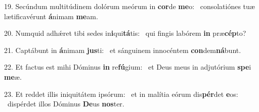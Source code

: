 19. Secúndum multitúdinem dolórum meórum in \textbf{cor}de \textbf{me}o: \ast\  consolatiónes tuæ lætificavérunt \textbf{á}nimam \textbf{me}am.\

20. Numquid adhǽret tibi sedes in\textbf{i}qui\textbf{tá}tis: \ast\  qui fingis labórem \textbf{in} præ\textbf{cép}to?\

21. Captábunt in \textbf{á}nimam \textbf{jus}ti: \ast\  et sánguinem innocéntem \textbf{con}dem\textbf{ná}bunt.\

22. Et factus est mihi Dóminus \textbf{in} re\textbf{fú}gium: \ast\  et Deus meus in adjutórium \textbf{spe}i \textbf{me}æ.\

23. Et reddet illis iniquitátem ipsórum: \dag\  et in malítia eórum dis\textbf{pér}det \textbf{e}os: \ast\  dispérdet illos Dóminus \textbf{De}us \textbf{nos}ter.\

